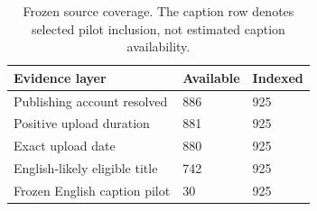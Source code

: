 \begin{table}[t]
\centering\small\setlength{\tabcolsep}{3pt}
\begin{tabular}{p{}p{}p{}}
\toprule
Evidence layer & Available & Indexed \\ \midrule
Publishing account resolved & 886 & 925 \\
Positive upload duration & 881 & 925 \\
Exact upload date & 880 & 925 \\
English-likely eligible title & 742 & 925 \\
Frozen English caption pilot & 30 & 925 \\
\bottomrule
\end{tabular}
\caption{Frozen source coverage. The caption row denotes selected pilot inclusion, not estimated caption availability.}
\end{table}